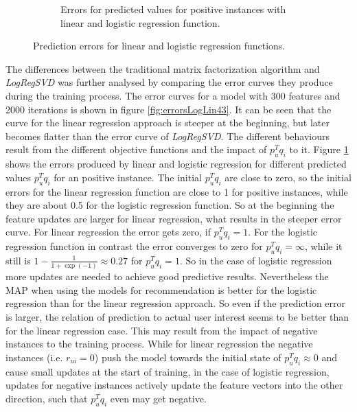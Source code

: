 \documentclass[10pt]{reportMaster}
\begin{document}
\begin{figure}
\begin{subfigure}{0.5\textwidth}
		\caption{Errors for predicted values for positive instances with linear and logistic regression function.}
		\label{fig:predictionErrors}
	\end{subfigure}
	\caption{Prediction errors for linear and logistic regression functions.}
	\label{fig:errors}
\end{figure}

The differences between the traditional matrix factorization algorithm and \textit{LogRegSVD} was further analysed by comparing the error curves they produce during the training process.
The error curves for a model with 300 features and 2000 iterations is shown in figure \ref{fig:errorsLogLin43}.
It can be seen that the curve for the linear regression approach is steeper at the beginning, but later becomes flatter than the error curve of \textit{LogRegSVD}.
The different behaviours result from the different objective functions and the impact of $p_u^Tq_i$ to it.
Figure \ref{fig:predictionErrors} shows the errors produced by linear and logistic regression for different predicted values $p_u^Tq_i$ for an positive instance.
The initial $p_u^Tq_i$ are close to zero, so the initial errors for the linear regression function are close to 1 for positive instances, while they are about 0.5 for the logistic regression function.
So at the beginning the feature updates are larger for linear regression, what results in the steeper error curve.
For linear regression the error gets zero, if $p_u^Tq_i = 1$.
For the logistic regression function in contrast the error converges to zero for $p_u^Tq_i = \infty$, while it still is $1 - \frac{1}{1 + \exp(-1)} \approx 0.27$ for $p_u^Tq_i = 1$.
So in the case of logistic regression more updates are needed to achieve good predictive results.
Nevertheless the MAP when using the models for recommendation is better for the logistic regression than for the linear regression approach.
So even if the prediction error is larger, the relation of prediction to actual user interest seems to be better than for the linear regression case.
This may result from the impact of negative instances to the training process.
While for linear regression the negative instances (i.e. $r_{ui} = 0$) push the model towards the initial state of $p_u^Tq_i \approx 0$ and cause small updates at the start of training, in the case of logistic regression, updates for negative instances actively update the feature vectors into the other direction, such that $p_u^Tq_i$ even may get negative.
\end{document}
